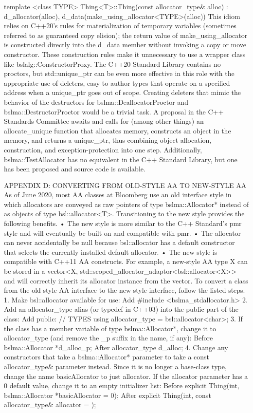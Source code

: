 {{{{{{{{template <class TYPE>
Thing<T>::Thing(const allocator_type& alloc)
  : d_allocator(alloc), d_data(make_using_allocator<TYPE>(alloc)) { }
This idiom relies on C++20’s rules for materialization of temporary variables (sometimes referred to as guaranteed copy elision); the return value of make_using_allocator is constructed directly into the d_data member without invoking a copy or move constructor. These construction rules make it unnecessary to use a wrapper class like bslalg::ConstructorProxy.
The C++20 Standard Library contains no proctors, but std::unique_ptr can be even more effective in this role with the appropriate use of deleters, easy-to-author types that operate on a specified address when a unique_ptr goes out of scope. Creating deleters that mimic the behavior of the destructors for bslma::DeallocatorProctor and bslma::DestructorProctor would be a trivial task. A proposal in the C++ Standards Committee awaits and calls for (among other things) an allocate_unique function that allocates memory, constructs an object in the memory, and returns a unique_ptr, thus combining object allocation, construction, and exception-protection into one step.  Additionally, bslma::TestAllocator has no equivalent in the C++ Standard Library, but one has been proposed and source code is available. 

APPENDIX D: CONVERTING FROM OLD-STYLE AA TO NEW-STYLE AA
As of June 2020, most AA classes at Bloomberg use an old interface style in which allocators are conveyed as raw pointers of type bslma::Allocator* instead of as objects of type bsl::allocator<T>. Transitioning to the new style provides the following benefits.
•	The new style is more similar to the C++ Standard’s pmr style and will eventually be built on and compatible with pmr.
•	The allocator can never accidentally be null because bsl::allocator has a default constructor that selects the currently installed default allocator.
•	The new style is compatible with C++11 AA constructs. For example, a new-style AA type X can be stored in a vector<X, std::scoped_allocator_adaptor<bsl::allocator<X>> and will correctly inherit its allocator instance from the vector.
To convert a class from the old-style AA interface to the new-style interface, follow the listed steps.
1.	Make bsl::allocator available for use:
Add	#include <bslma_stdallocator.h>
2.	Add an allocator_type alias (or typedef in C++03) into the public part of the class:
Add	  public:
    // TYPES
    using allocator_type = bsl::allocator<char>;
3.	If the class has a member variable of type bslma::Allocator*, change it to allocator_type (and remove the _p suffix in the name, if any):
Before	bslma::Allocator *d_alloc_p;
After	allocator_type d_alloc;
4.	Change any constructors that take a bslma::Allocator* parameter to take a const allocator_type& parameter instead. Since it is no longer a base-class type, change the name basicAllocator to just allocator. If the allocator parameter has a 0 default value, change it to an empty initializer list:
Before	explicit Thing(int, bslma::Allocator *basicAllocator = 0);
After	explicit Thing(int, const allocator_type& allocator = {});

}}}}}}}}
